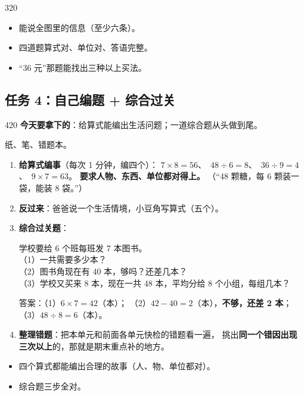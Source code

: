 \begin{lesson}{3}{20}
\begin{passbox}
\begin{itemize}
  \item 能说全图里的信息（至少六条）。
  \item 四道题算式对、单位对、答语完整。
  \item “36 元”那题能找出三种以上买法。
\end{itemize}
\end{passbox}
\end{lesson}

\subsection{任务 4：自己编题 + 综合过关}

\begin{lesson}{4}{20}
\textbf{今天要拿下的}：给算式能编出生活问题；一道综合题从头做到尾。

\begin{materials}
纸、笔、错题本。
\end{materials}

\begin{enumerate}
  \item \textbf{给算式编事}（每次 1 分钟，编四个）：
        $7\times8=56$、\ $48\div6=8$、\ $36\div9=4$、\ $9\times7=63$。
        \textbf{要求人物、东西、单位都对得上。}
        （“48 颗糖，每 6 颗装一袋，能装 8 袋。”）
  \item \textbf{反过来}：爸爸说一个生活情境，小豆角写算式（五个）。
  \item \textbf{综合过关题}：
        \begin{tipbox}
        学校要给 6 个班每班发 7 本图书。\\
        （1）一共需要多少本？\\
        （2）图书角现在有 40 本，够吗？还差几本？\\
        （3）学校又买来 8 本，现在一共 48 本，平均分给 8 个小组，每组几本？
        \end{tipbox}
        答案：（1）$6\times7=42$（本）；
        （2）$42-40=2$（本），\textbf{不够，还差 2 本}；
        （3）$48\div8=6$（本）。
  \item \textbf{整理错题}：把本单元和前面各单元快检的错题看一遍，
        挑出\textbf{同一个错因出现三次以上}的，那就是期末重点补的地方。
\end{enumerate}

\begin{passbox}
\begin{itemize}
  \item 四个算式都能编出合理的故事（人、物、单位都对）。
  \item 综合题三步全对。
\end{itemize}
\end{passbox}
\end{lesson}

